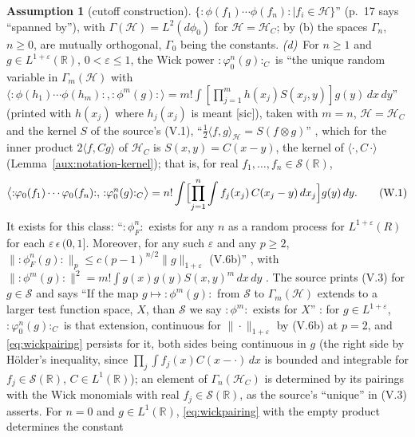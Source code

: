 \documentclass[11pt,a4paper]{article}
\theoremstyle{plain}
\theoremstyle{definition}
\newtheorem{assumption}{Assumption}
\theoremstyle{plain}
\theoremstyle{definition}
\newcommand{\R}{\mathbb{R}}
\newcommand{\HH}{\mathcal{H}}
\newcommand{\ip}[2]{\langle #1,#2\rangle}
\begin{document}
\begin{assumption}[cutoff construction]
$\{{:}\phi(f_1)\cdots\phi(f_n){:}\mid f_i\in\mathcal H\}$'' \cite[p.~16]{SimonBook} (p.~17
says ``spanned by''), with $\Gamma(\HH)=L^2(d\phi_0)$ for $\HH=\HH_C$; by (b) the spaces
$\Gamma_n$, $n\ge0$, are mutually orthogonal, $\Gamma_0$ being the constants.
\emph{(d)}~For $n\ge1$ and $g\in L^{1+\varepsilon}(\R)$, $0<\varepsilon\le1$, the Wick power
${:}\varphi_0^n(g){:}_C$ is ``the unique random variable in $\Gamma_m(\HH)$ with
$\langle{:}\phi(h_1)\cdots\phi(h_m){:},{:}\phi^m(g){:}\rangle=m!\int[\prod_{j=1}^mh(x_j)
S(x_j,y)]g(y)\,dx\,dy$'' \cite[(V.3), p.~136]{SimonBook} (printed with $h(x_j)$ where
$h_j(x_j)$ is meant [sic]), taken with $m=n$, $\HH=\HH_C$ and the kernel $S$ of the
source's (V.1), ``$\frac12\langle f,g\rangle_{\mathcal H}=S(f\otimes g)$'' \cite[p.~134]{SimonBook},
which for the inner product $2\ip f{Cg}$ of $\HH_C$ is $S(x,y)=C(x-y)$, the kernel of
$\ip\cdot{C\,\cdot}$ (Lemma~\ref{aux:notation-kernel}); that is, for real
$f_1,\dots,f_n\in\mathcal S(\R)$,
\begin{equation}
 \bigl\langle{:}\varphi_0(f_1)\cdots\varphi_0(f_n){:},\,{:}\varphi_0^n(g){:}_C\bigr\rangle
 =n!\int\Bigl[\prod_{j=1}^n\int f_j(x_j)\,C(x_j-y)\,dx_j\Bigr]g(y)\,dy .
 \tag{W.1}\label{eq:wickpairing}
\end{equation}
It exists for this class: ``${:}\phi_F^n{:}$ exists for any $n$ as a random process for
$L^{1+\varepsilon}(R)$ for each $\varepsilon\,\epsilon\,(0,1]$.  Moreover, for any such
$\varepsilon$ and any $p\ge2$, $\|{:}\phi_F^n(g){:}\|_p\le c(p-1)^{n/2}\|g\|_{1+\varepsilon}$
(V.6b)'' \cite[Thm.~V.2(b), p.~138]{SimonBook}, with $\|{:}\phi^m(g){:}\|^2=m!\int
g(x)g(y)S(x,y)^m\,dx\,dy$ \cite[p.~137]{SimonBook}.  The source prints (V.3) for
$g\in\mathcal S$ and says ``If the map $g\mapsto{:}\phi^m(g){:}$ from $\mathcal S$ to
$\Gamma_m(\mathcal H)$ extends to a larger test function space, $X$, than $\mathcal S$ we say
${:}\phi^m{:}$ exists for $X$'' \cite[p.~136]{SimonBook}: for $g\in L^{1+\varepsilon}$,
${:}\varphi_0^n(g){:}_C$ is that extension, continuous for $\|\cdot\|_{1+\varepsilon}$ by
(V.6b) at $p=2$, and \eqref{eq:wickpairing} persists for it, both sides being continuous in
$g$ (the right side by H\"older's inequality, since $\prod_j\int f_j(x)C(x-\cdot)\,dx$ is
bounded and integrable for $f_j\in\mathcal S(\R)$, $C\in L^1(\R)$); an element of
$\Gamma_n(\HH_C)$ is determined by its pairings with the Wick monomials with real
$f_j\in\mathcal S(\R)$, as the source's ``unique'' in (V.3) asserts.  For $n=0$ and $g\in L^1(\R)$,
\eqref{eq:wickpairing} with the empty product determines the constant

\end{assumption}
\end{document}
